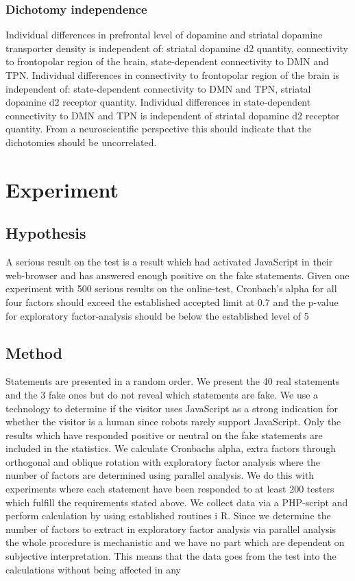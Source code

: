 \documentclass[11pt,a4paper]{article}
\begin{document}
\subsubsection{Dichotomy independence}
Individual differences in prefrontal level of dopamine and striatal dopamine transporter density is independent of: striatal dopamine d2 quantity, connectivity to frontopolar region of the brain, state-dependent connectivity to DMN and TPN.
Individual differences in connectivity to frontopolar region of the brain is independent of: state-dependent connectivity to DMN and TPN, striatal dopamine d2 receptor quantity.
Individual differences in state-dependent connectivity to DMN and TPN is independent of striatal dopamine d2 receptor quantity.
From a neuroscientific perspective this should indicate that the dichotomies should be uncorrelated.

\section{Experiment}

\subsection{Hypothesis}
A serious result on the test is a result which had activated JavaScript in their web-browser and has answered enough positive on the fake statements.
Given one experiment with 500 serious results on the online-test, Cronbach's alpha for all four factors should exceed the established accepted limit at 0.7 and the p-value for exploratory factor-analysis should be below the established level of 5%

\subsection{Method}
Statements are presented in a random order. We present the 40 real statements and the 3 fake ones but do not reveal which statements are fake. We use a technology to determine if the visitor uses JavaScript as a strong indication for whether the visitor is a human since robots rarely support JavaScript. Only the results which have responded positive or neutral on the fake statements are included in the statistics.
We calculate Cronbachs alpha, extra factors through orthogonal and oblique rotation with exploratory factor analysis where the number of factors are determined using parallel analysis. We do this with experiments where each statement have been responded to at least 200 testers which fulfill the requirements stated above.
We collect data via a PHP-script and perform calculation by using established routines i R. Since we determine the number of factors to extract in exploratory factor analysis via parallel analysis the whole procedure is mechanistic and we have no part which are dependent on subjective interpretation. This means that the data goes from the test into the calculations without being affected in any
\end{document}
